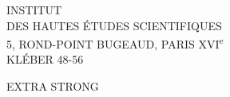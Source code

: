 

\begin{center}
INSTITUT\\
DES HAUTES ÉTUDES SCIENTIFIQUES\\
5, ROND-POINT BUGEAUD, PARIS XVI\textsuperscript{e}\\
KLÉBER 48-56
\end{center}

 EXTRA STRONG 

